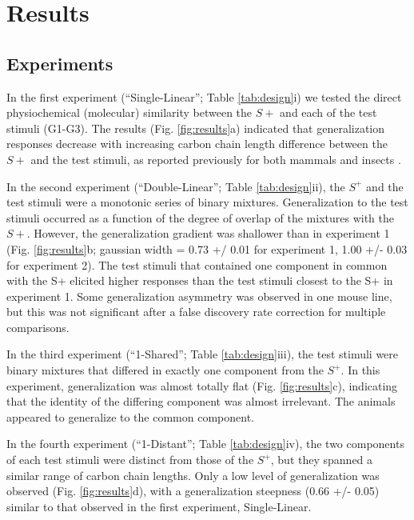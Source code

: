 \section*{Results}
\label{results}
\subsection*{Experiments}
\label{results_experiments}
In the first experiment (``Single-Linear''; Table \ref{tab:design}i) we tested the direct physiochemical (molecular) similarity between the $S+$ and each of the test stimuli (G1-G3). 
The results (Fig. \ref{fig:results}a) indicated that generalization responses decrease with increasing carbon chain length difference between the $S+$ and the test stimuli, as reported previously for both mammals and insects \cite{18810459}\cite{24488965}\cite{11551996}\cite{19129384}.  

In the second experiment (``Double-Linear''; Table \ref{tab:design}ii), the $S^+$ and the test stimuli were a monotonic series of binary mixtures.
Generalization to the test stimuli occurred as a function of the degree of overlap of the mixtures with the $S+$. 
However, the generalization gradient was shallower than in experiment 1 (Fig. \ref{fig:results}b; gaussian width = 0.73 +/ 0.01 for experiment 1, 1.00 +/- 0.03 for experiment 2). 
The test stimuli that contained one component in common with the S+ elicited higher responses than the test stimuli closest to the S+ in experiment 1. 
Some generalization asymmetry was observed in one mouse line, but this was not significant after a false discovery rate correction for multiple comparisons.   

In the third experiment (``1-Shared''; Table \ref{tab:design}iii), the test stimuli were binary mixtures that differed in exactly one component from the $S^+$.  
In this experiment, generalization was almost totally flat (Fig. \ref{fig:results}c), indicating that the identity of the differing component was almost irrelevant.  
The animals appeared to generalize to the common component.  

In the fourth experiment (``1-Distant''; Table \ref{tab:design}iv), the two components of each test stimuli were distinct from those of the $S^+$, but they spanned a similar range of carbon chain lengths. 
Only a low level of generalization was observed (Fig. \ref{fig:results}d), with a generalization steepness (0.66 +/- 0.05) similar to that observed in the first experiment, Single-Linear.  

